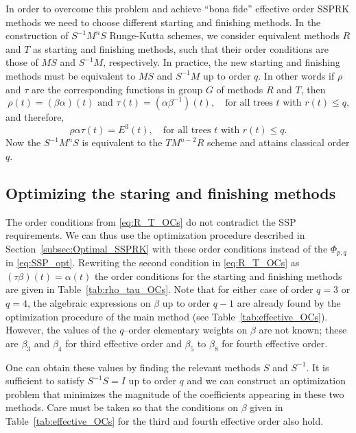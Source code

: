 In order to overcome this problem and achieve ``bona fide'' effective order SSPRK methods we 
need to choose different starting and finishing methods. 
In the construction of $S^{-1}M^nS$ Runge-Kutta schemes, we consider equivalent methods 
$R$ and $T$ as starting and finishing methods, such that their order conditions are those of 
$MS$ and $S^{-1}M$, respectively. 
In practice, the new starting and finishing methods must be equivalent to $MS$ and 
$S^{-1}M$ up to order $q$. 
In other words if $\rho$ and $\tau$ are the corresponding functions in group $G$ of methods $R$ and $T$, then
\begin{equation} \label{eq:R_T_OCs}
    \rho(t) = (\beta\alpha)(t) \text{ and } \tau(t) = (\alpha\beta^{-1})(t), \quad \text{for all 
    trees $t$ with $r(t) \leq q$,}
\end{equation}
and therefore,
\begin{equation} \label{eq:RMT_OCs}
    \rho\alpha\tau(t) = E^3(t), \quad \text{for all trees $t$ with $r(t) \leq q$.}
\end{equation}
Now the $S^{-1}M^nS$ is equivalent to the $TM^{n-2}R$ scheme and attains classical order $q$.

\subsection{Optimizing the staring and finishing methods}\label{subsubsec:opt_methods}
The order conditions from \eqref{eq:R_T_OCs} do not contradict the SSP requirements.  
We can thus use the optimization procedure described in Section~\ref{subsec:Optimal_SSPRK} 
with these order conditions instead of the $\Phi_{p,q}$ in \eqref{eq:SSP_opt}. 
Rewriting the second condition in \eqref{eq:R_T_OCs} as $(\tau\beta)(t) = \alpha(t)$ 
the 
order conditions for the starting and finishing methods are given in 
Table~\ref{tab:rho_tau_OCs}. 
Note that for either case of order $q=3$ or $q=4$, the algebraic expressions on 
$\beta$ up to order $q-1$ are already found by the optimization procedure of 
the main method (see Table~\ref{tab:effective_OCs}). 
However, the values of the $q$--order elementary weights on $\beta$ are not known; these 
are $\beta_3$ and $\beta_4$ for third effective order and $\beta_5$ to $\beta_8$ for fourth 
effective order. 

One can obtain these values by finding the relevant methods $S$ and $S^{-1}$. 
It is sufficient to satisfy $S^{-1}S = I$ up to order $q$ and we can construct an optimization 
problem that minimizes the magnitude of the coefficients appearing in these two methods.
Care must be taken so that the conditions on $\beta$ given in Table~\ref{tab:effective_OCs} for the third and fourth effective order also hold. 

